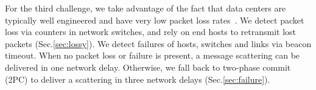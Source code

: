 For the third challenge, we take advantage of the fact that data centers are typically well engineered and have very low packet loss rates~\cite{ports2015designing}.
We detect packet loss via counters in network switches, and rely on end hosts to retransmit lost packets (Sec.\ref{sec:lossy}).
We detect failures of hosts, switches and links via beacon timeout.
When no packet loss or failure is present, a message scattering can be delivered in one network delay. Otherwise, we fall back to two-phase commit (2PC) to deliver a scattering in three network delays (Sec.\ref{sec:failure}).






